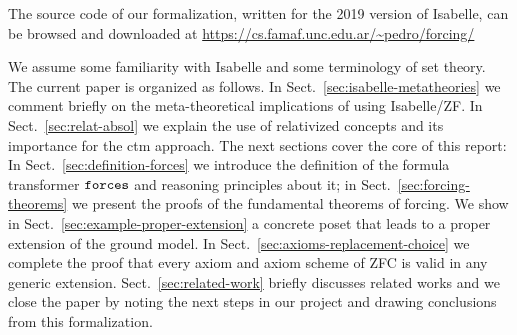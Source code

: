 The source code of our formalization, written for the 2019 version of
Isabelle, can be browsed and downloaded at
\url{https://cs.famaf.unc.edu.ar/~pedro/forcing/}

We assume some familiarity with Isabelle and some terminology of set
theory. The current paper is organized as follows. In
Sect.~\ref{sec:isabelle-metatheories} we comment briefly on the
meta-theoretical implications of using Isabelle/ZF. In
Sect.~\ref{sec:relat-absol} we explain the use of relativized concepts
and its importance for the ctm approach. The next sections cover the
core of this report: In Sect.~\ref{sec:definition-forces} we introduce
the definition of the formula transformer $\mathop{\mathtt{forces}}$ and reasoning
principles about it; in Sect.~\ref{sec:forcing-theorems} we present
the proofs of the fundamental theorems of forcing. We show in
Sect.~\ref{sec:example-proper-extension} a concrete poset that leads
to a proper extension of the ground model. In
Sect.~\ref{sec:axioms-replacement-choice} we complete the proof that
every axiom and axiom scheme of ZFC is valid in any generic
extension. Sect.~\ref{sec:related-work} briefly discusses related
works and we close the paper by noting the next steps in our project
and drawing conclusions from this formalization.

